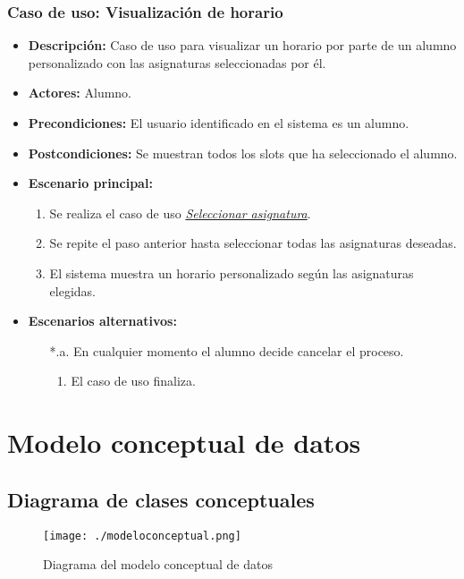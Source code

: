 \subsubsection*{Caso de uso: Visualización de horario}
\begin{itemize}
\item{\bf Descripción:} Caso de uso para visualizar un horario por parte de un alumno personalizado con las asignaturas seleccionadas por él.
\item{\bf Actores:} Alumno.
\item{\bf Precondiciones:} El usuario identificado en el sistema es un alumno.
\item{\bf Postcondiciones:} Se muestran todos los slots que ha seleccionado el alumno.
\item{\bf Escenario principal:}
	\begin{enumerate}
	\item Se realiza el caso de uso {\em \hyperref[select_asignatura]{Seleccionar asignatura}}.
	\item Se repite el paso anterior hasta seleccionar todas las asignaturas deseadas.
	\item El sistema muestra un horario personalizado según las asignaturas elegidas.
	\end{enumerate}
\item{\bf Escenarios alternativos:}
	\begin{itemize}
		\item[*.a.] En cualquier momento el alumno decide cancelar el proceso.
		\begin{enumerate}
			\item El caso de uso finaliza.
		\end{enumerate}
	\end{itemize}
\end{itemize}

\section{Modelo conceptual de datos}

\subsection{Diagrama de clases conceptuales}

\begin{figure}[H] 
  \label{modelo-conceptual} 
	\begin{center}
    \texttt{[image: ./modeloconceptual.png]}
  \end{center}
\caption{Diagrama del modelo conceptual de datos}
\end{figure}

